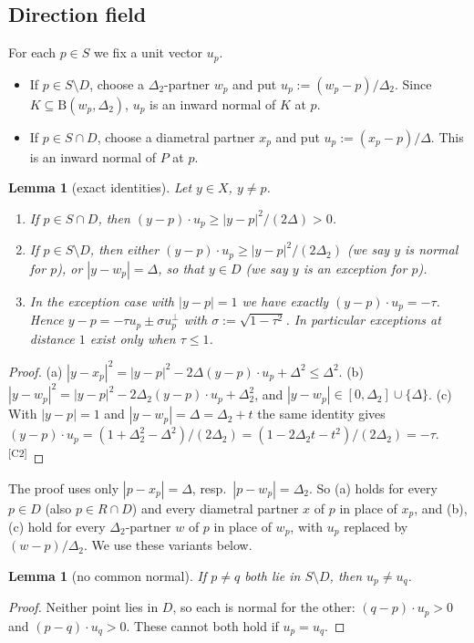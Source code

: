 \documentclass[11pt]{amsart}
\newtheorem{lemma}[theorem]{Lemma}
\theoremstyle{definition}
\theoremstyle{remark}
\newcommand{\Dt}{\Delta_2}
\newcommand{\Dd}{\mathrm{B}}      %
\newcommand{\chk}[1]{\textsuperscript{[#1]}}
\begin{document}
\subsection*{Direction field}
For each $p\in S$ we fix a unit vector $u_p$.
\begin{itemize}[leftmargin=2em]
\item If $p\in S\setminus D$, choose a $\Dt$-partner $w_p$ and put $u_p:=(w_p-p)/\Dt$. Since $K\subseteq\Dd(w_p,\Dt)$, $u_p$ is an inward normal of $K$ at $p$.
\item If $p\in S\cap D$, choose a diametral partner $x_p$ and put $u_p:=(x_p-p)/\Delta$. This is an inward normal of $P$ at $p$.
\end{itemize}

\begin{lemma}[exact identities]\label{lem:identities}
Let $y\in X$, $y\neq p$.
\begin{enumerate}[label=(\alph*)]
\item If $p\in S\cap D$, then $(y-p)\cdot u_p\ge |y-p|^2/(2\Delta)>0$.
\item If $p\in S\setminus D$, then either $(y-p)\cdot u_p\ge |y-p|^2/(2\Dt)$ (we say $y$ is \emph{normal} for $p$), or $|y-w_p|=\Delta$, so that $y\in D$ (we say $y$ is an \emph{exception} for $p$).
\item In the exception case with $|y-p|=1$ we have exactly $(y-p)\cdot u_p=-\tau$. Hence $y-p=-\tau u_p\pm\sigma u_p^{\perp}$ with $\sigma:=\sqrt{1-\tau^2}$. In particular exceptions at distance $1$ exist only when $\tau\le 1$.
\end{enumerate}
\end{lemma}
\begin{proof}
(a) $|y-x_p|^2=|y-p|^2-2\Delta(y-p)\cdot u_p+\Delta^2\le\Delta^2$. (b) $|y-w_p|^2=|y-p|^2-2\Dt(y-p)\cdot u_p+\Dt^2$, and $|y-w_p|\in[0,\Dt]\cup\{\Delta\}$. (c) With $|y-p|=1$ and $|y-w_p|=\Delta=\Dt+t$ the same identity gives $(y-p)\cdot u_p=(1+\Dt^2-\Delta^2)/(2\Dt)=(1-2\Dt t-t^2)/(2\Dt)=-\tau$.\chk{C2}
\end{proof}
The proof uses only $|p-x_p|=\Delta$, resp.\ $|p-w_p|=\Dt$. So (a) holds for every $p\in D$ (also $p\in R\cap D$) and every diametral partner $x$ of $p$ in place of $x_p$, and (b), (c) hold for every $\Dt$-partner $w$ of $p$ in place of $w_p$, with $u_p$ replaced by $(w-p)/\Dt$. We use these variants below.

\begin{lemma}[no common normal]\label{lem:nocommon}
If $p\neq q$ both lie in $S\setminus D$, then $u_p\neq u_q$.
\end{lemma}
\begin{proof}
Neither point lies in $D$, so each is normal for the other: $(q-p)\cdot u_p>0$ and $(p-q)\cdot u_q>0$. These cannot both hold if $u_p=u_q$.
\end{proof}
\end{document}
